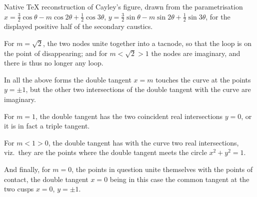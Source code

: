\documentclass[11pt]{article}
\begin{document}
\begin{center}

\smallskip
\footnotesize Native TeX reconstruction of Cayley's figure, drawn from the
parametrisation
$x=\tfrac32\cos\theta-m\cos2\theta+\tfrac12\cos3\theta$,
$y=\tfrac32\sin\theta-m\sin2\theta+\tfrac12\sin3\theta$,
for the displayed positive half of the secondary caustics.
\end{center}

For $m = \sqrt{2}$, the two nodes unite together into a tacnode, so that the loop is on the point of disappearing; and for $m < \sqrt{2} > 1$ the nodes are imaginary, and there is thus no longer any loop.

In all the above forms the double tangent $x = m$ touches the curve at the points $y = \pm 1$, but the other two intersections of the double tangent with the curve are imaginary.

For $m = 1$, the double tangent has the two coincident real intersections $y = 0$, or it is in fact a triple tangent.

For $m < 1 > 0$, the double tangent has with the curve two real intersections, viz.\ they are the points where the double tangent meets the circle $x^{2} + y^{2} = 1$.

And finally, for $m = 0$, the points in question unite themselves with the points of contact, the double tangent $x = 0$ being in this case the common tangent at the two cusps $x = 0$, $y = \pm 1$.
\end{document}
